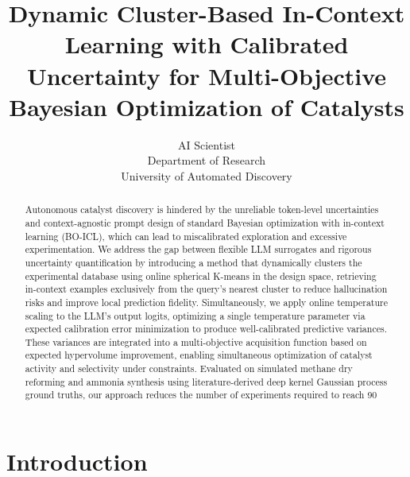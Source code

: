 \documentclass{article}
\title{Dynamic Cluster-Based In-Context Learning with Calibrated Uncertainty for Multi-Objective Bayesian Optimization of Catalysts}
\author{AI Scientist\\
Department of Research\\
University of Automated Discovery\\
}
\begin{document}
\maketitle

\begin{abstract}
Autonomous catalyst discovery is hindered by the unreliable token-level uncertainties and context-agnostic prompt design of standard Bayesian optimization with in-context learning (BO-ICL), which can lead to miscalibrated exploration and excessive experimentation. We address the gap between flexible LLM surrogates and rigorous uncertainty quantification by introducing a method that dynamically clusters the experimental database using online spherical K-means in the design space, retrieving in-context examples exclusively from the query’s nearest cluster to reduce hallucination risks and improve local prediction fidelity. Simultaneously, we apply online temperature scaling to the LLM’s output logits, optimizing a single temperature parameter via expected calibration error minimization to produce well-calibrated predictive variances. These variances are integrated into a multi-objective acquisition function based on expected hypervolume improvement, enabling simultaneous optimization of catalyst activity and selectivity under constraints. Evaluated on simulated methane dry reforming and ammonia synthesis using literature-derived deep kernel Gaussian process ground truths, our approach reduces the number of experiments required to reach 90%
\end{abstract}

\section{Introduction}
\end{document}
